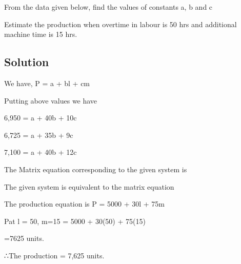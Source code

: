 \documentclass[12pt, a4paper]{article}
\begin{document}
From the data given below, find the values of constants a, b and c



Estimate the production when overtime in labour is 50 hrs and additional machine time is 15 hrs.

\bigskip \subsection*{Solution}

We have, P = a + bl + cm

Putting above values we have

6,950 = a + 40b + 10c

6,725 = a + 35b + 9c

7,100 = a + 40b + 12c

The Matrix equation corresponding to the given system is



\therefore The given system is equivalent to the matrix equation



\therefore The production equation is P = 5000 + 30l + 75m

 Pat l = 50, m=15         = 5000 + 30(50) + 75(15)

=7625 units.

∴The production = 7,625 units.


\end{document}
